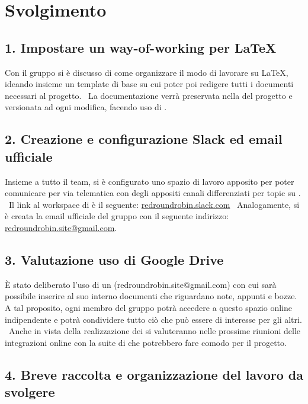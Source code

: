 \newpage
\section*{Svolgimento}

\subsection*{1. Impostare un way-of-working per \LaTeX{} }

Con il gruppo si è discusso di come organizzare il modo di lavorare su \LaTeX{}, ideando insieme un template di base su cui poter poi redigere tutti i documenti necessari al progetto. \
La documentazione verrà preservata nella  del progetto e versionata ad ogni modifica, facendo uso di .

\subsection*{2. Creazione e configurazione Slack ed email ufficiale}

Insieme a tutto il team, si è configurato uno spazio di lavoro apposito per poter comunicare per via telematica con degli appositi canali differenziati per topic su . \
Il link al workspace di  è il seguente: \href{http://redroundrobin.slack.com}{redroundrobin.slack.com} \
Analogamente, si è creata la email ufficiale del gruppo con il seguente indirizzo:
\href{mailto:redroundrobin.site@gmail.com}{redroundrobin.site@gmail.com}.


\subsection*{3. Valutazione uso di Google Drive}

È stato deliberato l'uso di un  (redroundrobin.site@gmail.com) con cui sarà possibile inserire al suo interno documenti che riguardano note, appunti e bozze. A tal proposito, ogni membro del gruppo potrà accedere a questo spazio online indipendente e potrà condividere tutto ciò che può essere di interesse per gli altri. \
Anche in vista della realizzazione dei  si valuteranno nelle prossime riunioni delle integrazioni online con la suite di  che potrebbero fare comodo per il progetto.


\subsection*{4. Breve raccolta e organizzazione del lavoro da svolgere}

